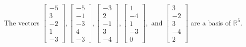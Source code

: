 \begin{exercise}
\begin{exerciseStatement}
  \end{exerciseStatement}
  \begin{exerciseAnswer}
   The vectors \(\left[\begin{array}{r}
-5 \\
3 \\
-2 \\
1 \\
-3
\end{array}\right] , \left[\begin{array}{r}
-5 \\
-1 \\
-3 \\
4 \\
-3
\end{array}\right] , \left[\begin{array}{r}
-3 \\
2 \\
-1 \\
3 \\
-4
\end{array}\right] , \left[\begin{array}{r}
1 \\
-4 \\
1 \\
-3 \\
0
\end{array}\right] , \text{ and } \left[\begin{array}{r}
3 \\
-2 \\
3 \\
-4 \\
2
\end{array}\right]\) 
  	 are  a basis of \(\mathbb{R}^5\).
  


  \end{exerciseAnswer}
\end{exercise}